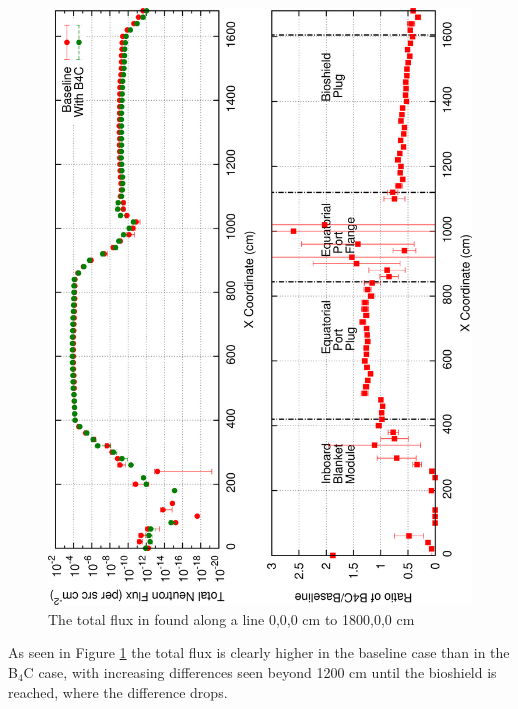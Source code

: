 \documentclass[12pt]{article}
\begin{document}
\begin{figure}[ht!]
  \centering
  \includegraphics[angle=-90,clip,scale=0.15]{../plots/neutron/total_flux_ep.png}     
  \caption{The total flux in found along a line 0,0,0 cm to 1800,0,0 cm}
  \label{fig:total_flux_ep}
\end{figure}

As seen in Figure \ref{fig:total_flux_ep} the total flux is clearly higher in 
the baseline case than in the B$_4$C case, with increasing differences seen
beyond 1200 cm until the bioshield is reached, where the difference drops.
\end{document}
